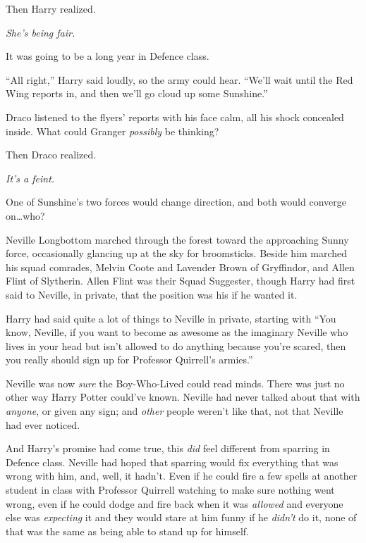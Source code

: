 Then Harry realized.

\emph{She’s being fair.}

It was going to be a long year in Defence class.

“All right,” Harry said loudly, so the army could hear. “We’ll wait until the Red Wing reports in, and then we’ll go cloud up some Sunshine.”

\later

Draco listened to the flyers’ reports with his face calm, all his shock concealed inside. What could Granger \emph{possibly} be thinking?

Then Draco realized.

\emph{It’s a feint.}

One of Sunshine’s two forces would change direction, and both would converge on…who?

\later

Neville Longbottom marched through the forest toward the approaching Sunny force, occasionally glancing up at the sky for broomsticks. Beside him marched his squad comrades, Melvin Coote and Lavender Brown of Gryffindor, and Allen Flint of Slytherin. Allen Flint was their Squad Suggester, though Harry had first said to Neville, in private, that the position was his if he wanted it.

Harry had said quite a lot of things to Neville in private, starting with “You know, Neville, if you want to become as awesome as the imaginary Neville who lives in your head but isn’t allowed to do anything because you’re scared, then you really should sign up for Professor Quirrell’s armies.”

Neville was now \emph{sure} the Boy-Who-Lived could read minds. There was just no other way Harry Potter could’ve known. Neville had never talked about that with \emph{anyone}, or given any sign; and \emph{other} people weren’t like that, not that Neville had ever noticed.

And Harry’s promise had come true, this \emph{did} feel different from sparring in Defence class. Neville had hoped that sparring would fix everything that was wrong with him, and, well, it hadn’t. Even if he could fire a few spells at another student in class with Professor Quirrell watching to make sure nothing went wrong, even if he could dodge and fire back when it was \emph{allowed} and everyone else was \emph{expecting} it and they would stare at him funny if he \emph{didn’t} do it, none of that was the same as being able to stand up for himself.

